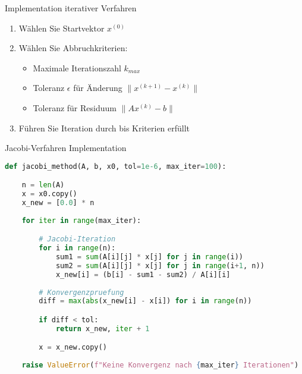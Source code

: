 \begin{KR}{Implementation iterativer Verfahren}
\begin{enumerate}
    \item Wählen Sie Startvektor $x^{(0)}$
    \item Wählen Sie Abbruchkriterien:
        \begin{itemize}
            \item Maximale Iterationszahl $k_{max}$
            \item Toleranz $\epsilon$ für Änderung $\|x^{(k+1)} - x^{(k)}\|$
            \item Toleranz für Residuum $\|Ax^{(k)} - b\|$
        \end{itemize}
    \item Führen Sie Iteration durch bis Kriterien erfüllt
\end{enumerate}
\end{KR}

\begin{examplecode}{Jacobi-Verfahren Implementation}
\begin{lstlisting}[language=Python, style=basesmol]
def jacobi_method(A, b, x0, tol=1e-6, max_iter=100):

    n = len(A)
    x = x0.copy()
    x_new = [0.0] * n
    
    for iter in range(max_iter):

        # Jacobi-Iteration
        for i in range(n):
            sum1 = sum(A[i][j] * x[j] for j in range(i))
            sum2 = sum(A[i][j] * x[j] for j in range(i+1, n))
            x_new[i] = (b[i] - sum1 - sum2) / A[i][i]
            
        # Konvergenzpruefung
        diff = max(abs(x_new[i] - x[i]) for i in range(n))

        if diff < tol:
            return x_new, iter + 1

        x = x_new.copy()
        
    raise ValueError(f"Keine Konvergenz nach {max_iter} Iterationen")
\end{lstlisting}
\end{examplecode}



